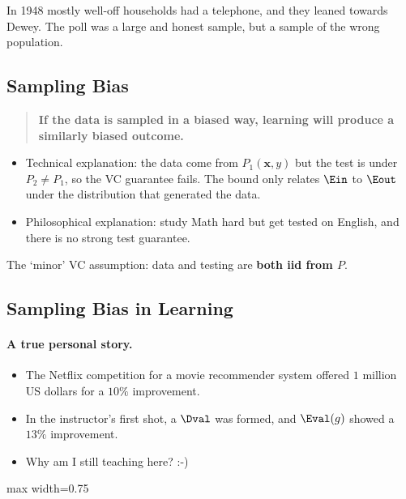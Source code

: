 In 1948 mostly well-off households had a telephone, and they leaned towards
Dewey. The poll was a large and honest sample, but a sample of the wrong
population.

\subsection{Sampling Bias}

\begin{quote}
    \textbf{If the data is sampled in a biased way, learning will produce a
    similarly biased outcome.}
\end{quote}

\begin{itemize}
    \item Technical explanation: the data come from \(P_1(\bm{x}, y)\) but
        the test is under \(P_2 \neq P_1\), so the VC guarantee fails. The
        bound only relates \(\Ein\) to \(\Eout\) under the distribution that
        generated the data.
    \item Philosophical explanation: study Math hard but get tested on
        English, and there is no strong test guarantee.
\end{itemize}

\begin{moral}
    The `minor' VC assumption: data and testing are \textbf{both iid from
    \(P\)}.
\end{moral}

\subsection{Sampling Bias in Learning}

\paragraph{A true personal story.}
\begin{itemize}
    \item The Netflix competition for a movie recommender system offered
        \(1\) million US dollars for a \(10\%\) improvement.
    \item In the instructor's first shot, a \(\Dval\) was formed, and
        \(\Eval(g)\) showed a \(13\%\) improvement.
    \item Why am I still teaching here? :-)
\end{itemize}

\begin{center}
    \begin{adjustbox}{max width=0.75\textwidth}
        \recsysfactors
    \end{adjustbox}
\end{center}

